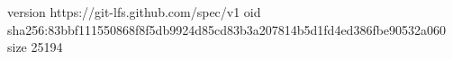 version https://git-lfs.github.com/spec/v1
oid sha256:83bbf111550868f8f5db9924d85cd83b3a207814b5d1fd4ed386fbe90532a060
size 25194
